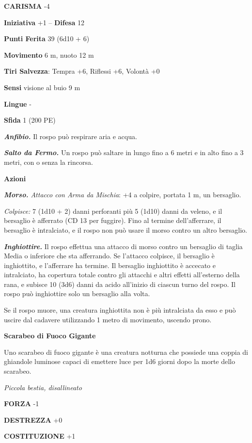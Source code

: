 \begin{multicols}{2}
\textbf{CARISMA} -4

\textbf{Iniziativa} +1 -- \textbf{Difesa} 12

\textbf{Punti Ferita} 39 (6d10 + 6)

\textbf{Movimento} 6 m, nuoto 12 m

\textbf{Tiri Salvezza}: Tempra +6, Riflessi +6, Volontà +0

\textbf{Sensi} visione al buio 9 m

\textbf{Lingue} -

\textbf{Sfida} 1 (200 PE)

\emph{\textbf{Anfibio.}} Il rospo può respirare aria e acqua.

\emph{\textbf{Salto da Fermo.}} Un rospo può saltare in lungo fino a 6 metri e in alto fino a 3 metri, con o senza la rincorsa.

\textbf{Azioni}

\emph{\textbf{Morso.} Attacco con Arma da Mischia}: +4 a colpire, portata 1 m, un bersaglio.

\emph{Colpisce:} 7 (1d10 + 2) danni perforanti più 5 (1d10) danni da veleno, e il bersaglio è afferrato (CD 13 per fuggire). Fino al termine dell'afferrare, il bersaglio è intralciato, e il rospo non può usare il morso contro un altro bersaglio.

\emph{\textbf{Inghiottire.}} Il rospo effettua una attacco di morso contro un bersaglio di taglia Media o inferiore che sta afferrando. Se l'attacco colpisce, il bersaglio è inghiottito, e l'afferrare ha termine. Il bersaglio inghiottito è accecato e intralciato, ha copertura totale contro gli attacchi e altri effetti all'esterno della rana, e subisce 10 (3d6) danni da acido all'inizio di ciascun turno del rospo. Il rospo può inghiottire solo un bersaglio alla volta.

Se il rospo muore, una creatura inghiottita non è più intralciata da esso e può uscire dal cadavere utilizzando 1 metro di movimento, uscendo prono.

\medskip\textbf{Scarabeo di Fuoco Gigante}

Uno scarabeo di fuoco gigante è una creatura notturna che possiede una coppia di ghiandole luminose capaci di emettere luce per 1d6 giorni dopo la morte dello scarabeo.

\emph{Piccola bestia, disallineato}

\textbf{FORZA} -1

\textbf{DESTREZZA} +0

\textbf{COSTITUZIONE} +1


\end{multicols}
